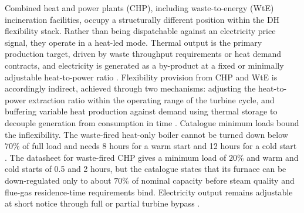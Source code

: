 Combined heat and power plants (CHP), including waste-to-energy (WtE) incineration facilities, occupy a structurally different position within the DH flexibility stack. Rather than being dispatchable against an electricity price signal, they operate in a heat-led mode. Thermal output is the primary production target, driven by waste throughput requirements or heat demand contracts, and electricity is generated as a by-product at a fixed or minimally adjustable heat-to-power ratio \cite{beiron_combined_2020}. Flexibility provision from CHP and WtE is accordingly indirect, achieved through two mechanisms: adjusting the heat-to-power extraction ratio within the operating range of the turbine cycle, and buffering variable heat production against demand using thermal storage to decouple generation from consumption in time \cite{wang_investigation_2019}. Catalogue minimum loads bound the inflexibility. The waste-fired heat-only boiler cannot be turned down below $70\%$ of full load and needs 8 hours for a warm start and 12 hours for a cold start \cite{danish_energy_agency_technology_2024}. The datasheet for waste-fired CHP gives a minimum load of $20\%$ and warm and cold starts of 0.5 and 2 hours, but the catalogue states that its furnace can be down-regulated only to about $70\%$ of nominal capacity before steam quality and flue-gas residence-time requirements bind. Electricity output remains adjustable at short notice through full or partial turbine bypass \cite{danish_energy_agency_technology_2024}. 

